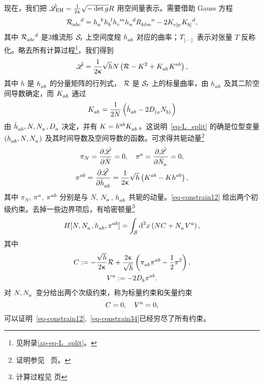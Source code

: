 		现在，我们把 $\tilde{\mathscr{L}}_{\text{EH}} = \frac{1}{2\upkappa} \sqrt{- \det g} {R}$ 用空间量表示。需要借助 Gauss 方程
		\begin{equation}
			\tensor{\spacecurR}{_a_b_c^d} = \tensor{h}{_a^k} \tensor{h}{_b^l} \tensor{h}{_c^m} \tensor{h}{_n^d} \tensor{\curR}{_k_l_m^n} - 2 \tensor{K}{_{c[a}} \tensor{K}{_{b]}^d}, \label{eqgauss}
		\end{equation}
		其中 $\tensor{\spacecurR}{_a_b_c^d}$ 是3维流形 $\mathcal{S}_t$ 上空间度规 $\tensor{h}{_a_b}$ 对应的曲率；$\tensor{T}{_{[\cdots]}}$ 表示对张量 $T$ 反称化。略去所有计算过程\footnote{见附录\ref{ap-eq-L_split}。}，我们得到
		\begin{equation}
			\Lad = \frac{1}{2\gkappa} \sqrt{h} N \left( \spacecurR - K^2 + \tensor{K}{_a_b} \tensor{K}{^a^b} \right), \label{eq-L_split}
		\end{equation}
		其中 $h$ 是 $\tensor{h}{_a_b}$ 的分量矩阵的行列式， $\mathcal{R}$ 是 $\mathcal{S}_t$ 上的标量曲率，由 $\tensor{h}{_a_b}$ 及其二阶空间导数确定，而 $\tensor{K}{_a_b}$ 通过
		\begin{equation}
			\tensor{K}{_a_b} = \frac{1}{2N} \left( \tensor{\dot{h}}{_a_b} - 2 \tensor{D}{_{(a}} \tensor{N}{_{b)}} \right) \label{eq-K_doth}
		\end{equation}
		由 $\tensor{\dot{h}}{_a_b}, N, \tensor{N}{_a}, \spaceD{a}$ 决定，并有 $K = \tensor{h}{^a^b} \tensor{K}{_a_b}$。这说明~\eqref{eq-L_split} 的确是位型变量 $\left( \tensor{h}{_a_b} , N, \tensor{N}{_a} \right)$ 及其时间导数及空间导数的函数。可求得共轭动量\footnote{证明参见~\pageref{ap-eq-pi} 页。}
		\begin{gather}
			\pi_N = \pdv{\Lad}{\dot{N}} = 0 \qc \tensor{\pi}{^a} = \pdv{\Lad}{\tensor{\dot{N}}{_a}} = 0, \label{eq-constrain12}\\
			\tensor{\pi}{^a^b} = \pdv{\Lad}{\tensor{\dot{h}}{_a_b}} = \frac{1}{2\gkappa} \sqrt{h} \left( \tensor{K}{^a^b} - K \tensor{h}{^a^b} \right), \label{eq-pi}
		\end{gather}
		其中 $\pi_N$, $\tensor{\pi}{^a}$, $\tensor{\pi}{^a^b}$ 分别是与 $N$, $\tensor{N}{_a}$, $\tensor{h}{_a_b}$ 共轭的动量。\eqref{eq-constrain12} 给出两个初级约束。去掉一些边界项后，有哈密顿量\footnote{计算过程见 \pageref{ap-eq-ADM_H} 页}
		\begin{equation}
			H[N,\tensor{N}{_a}, \tensor{h}{_a_b}, \tensor{\pi}{^a^b}] = \int_{\spc} \dd[3]{x} \left( N C + \tensor{N}{_a} \tensor{V}{^a} \right), \label{eq-ADM_H}
		\end{equation}
		其中
		\begin{gather}
			C \definedby - \frac{\sqrt{h}}{2\gkappa} \spacecurR + \frac{2\gkappa}{\sqrt{h}} \left( \tensor{\pi}{_a_b} \tensor{\pi}{^a^b} - \frac{1}{2} \pi^2 \right),\\
			\tensor{V}{^a} \definedby -2 \spaceD{b} \tensor{\pi}{^a^b}.
		\end{gather}
		对 $N, \tensor{N}{_a}$ 变分给出两个次级约束，称为标量约束和矢量约束
		\begin{equation}
			C = 0 \qc \tensor{V}{^a} = 0, \label{eq-constrain34}
		\end{equation}
		可以证明~\eqref{eq-constrain12},~\eqref{eq-constrain34}已经穷尽了所有约束。

